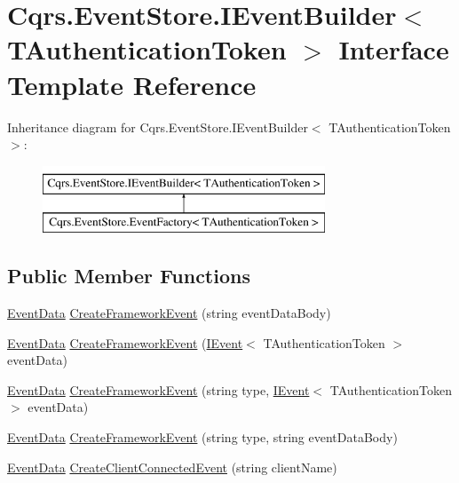 \hypertarget{interfaceCqrs_1_1EventStore_1_1IEventBuilder}{}\section{Cqrs.\+Event\+Store.\+I\+Event\+Builder$<$ T\+Authentication\+Token $>$ Interface Template Reference}
\label{interfaceCqrs_1_1EventStore_1_1IEventBuilder}
Inheritance diagram for Cqrs.\+Event\+Store.\+I\+Event\+Builder$<$ T\+Authentication\+Token $>$\+:\begin{figure}[H]
\begin{center}
\leavevmode
\includegraphics[height=2.000000cm]{interfaceCqrs_1_1EventStore_1_1IEventBuilder}
\end{center}
\end{figure}
\subsection*{Public Member Functions}
\begin{DoxyCompactItemize}
\item 
\hyperlink{classCqrs_1_1Events_1_1EventData}{Event\+Data} \hyperlink{interfaceCqrs_1_1EventStore_1_1IEventBuilder_a341d5c54ef8a271a8248e0a5266e6228}{Create\+Framework\+Event} (string event\+Data\+Body)
\item 
\hyperlink{classCqrs_1_1Events_1_1EventData}{Event\+Data} \hyperlink{interfaceCqrs_1_1EventStore_1_1IEventBuilder_a8ee9560f7b53c67b9946c3b0719eca96}{Create\+Framework\+Event} (\hyperlink{interfaceCqrs_1_1Events_1_1IEvent}{I\+Event}$<$ T\+Authentication\+Token $>$ event\+Data)
\item 
\hyperlink{classCqrs_1_1Events_1_1EventData}{Event\+Data} \hyperlink{interfaceCqrs_1_1EventStore_1_1IEventBuilder_ab9608f44e12ce029fc98ad0eee53516a}{Create\+Framework\+Event} (string type, \hyperlink{interfaceCqrs_1_1Events_1_1IEvent}{I\+Event}$<$ T\+Authentication\+Token $>$ event\+Data)
\item 
\hyperlink{classCqrs_1_1Events_1_1EventData}{Event\+Data} \hyperlink{interfaceCqrs_1_1EventStore_1_1IEventBuilder_a8e3df7af1f54ac873d1a768b78b82c6d}{Create\+Framework\+Event} (string type, string event\+Data\+Body)
\item 
\hyperlink{classCqrs_1_1Events_1_1EventData}{Event\+Data} \hyperlink{interfaceCqrs_1_1EventStore_1_1IEventBuilder_ae11ead7fa69632041e081e60f51c4e9f}{Create\+Client\+Connected\+Event} (string client\+Name)
\end{DoxyCompactItemize}


